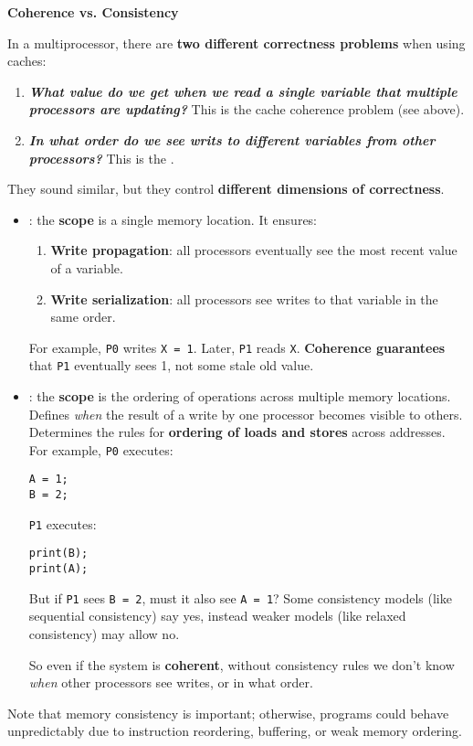 \highspace
\begin{flushleft}
    \textcolor{Red2}{ \textbf{Coherence vs. Consistency}}
\end{flushleft}
In a multiprocessor, there are \textbf{two different correctness problems} when using caches:
\begin{enumerate}
    \item \textbf{\emph{What value do we get when we read a single variable that multiple processors are updating?}} This is the cache coherence problem (see above).
    \item \textbf{\emph{In what order do we see writs to different variables from other processors?}} This is the .
\end{enumerate}
They sound similar, but they control \textbf{different dimensions of correctness}.
\begin{itemize}
    \item {}: the \textbf{scope} is a single memory location. It ensures:
    \begin{enumerate}
        \item \textbf{Write propagation}: all processors eventually see the most recent value of a variable.
        \item \textbf{Write serialization}: all processors see writes to that variable in the same order.
    \end{enumerate}
    For example, \texttt{P0} writes \texttt{X = 1}. Later, \texttt{P1} reads \texttt{X}. \textbf{Coherence guarantees} that \texttt{P1} eventually sees 1, not some stale old value.
 
    \item {}: the \textbf{scope} is the ordering of operations across multiple memory locations. Defines \emph{when} the result of a write by one processor becomes visible to others. Determines the rules for \textbf{ordering of loads and stores} across addresses. For example, \texttt{P0} executes:
    \begin{lstlisting}
A = 1;
B = 2;\end{lstlisting}
    \texttt{P1} executes:
    \begin{lstlisting}
print(B);
print(A);\end{lstlisting}
    But if \texttt{P1} sees \texttt{B = 2}, must it also see \texttt{A = 1}? Some consistency models (like sequential consistency) say yes, instead weaker models (like relaxed consistency) may allow no.

    So even if the system is \textbf{coherent}, without consistency rules we don't know \emph{when} other processors see writes, or in what order.
\end{itemize}
Note that memory consistency is important; otherwise, programs could behave unpredictably due to instruction reordering, buffering, or weak memory ordering.

